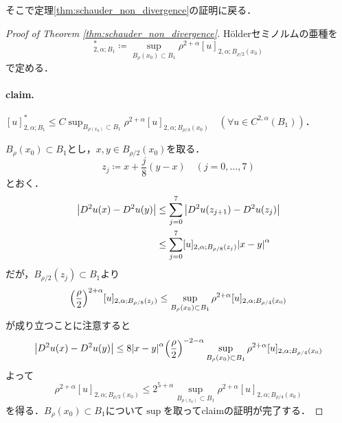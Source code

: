 \documentclass[a4paper]{ltjsarticle}
\newcommand{\1}{\mathbbm{1}}
\numberwithin{equation}{section}
\theoremstyle{definition}
\begin{document}
そこで定理\ref{thm:schauder_non_divergence}の証明に戻る．
\begin{proof}[Proof of Theorem \ref{thm:schauder_non_divergence}]
    Hölderセミノルムの亜種を
    \begin{equation}
        [u]^\ast_{2,\alpha;B_1}\coloneqq \sup_{B_\rho(x_0)\subset B_1}\rho^{2+\alpha}[u]_{2,\alpha;B_{\rho/2}(x_0)}
    \end{equation}
    で定める．
    \paragraph*{claim.}$[u]_{2,\alpha;B_1}^\ast\leq C\sup_{B_{\rho(x_0)}\subset B_1}\rho^{2+\alpha}[u]_{2,\alpha;B_{\rho/4}(x_0)}\quad (\forall u\in C^{2,\alpha}(B_1))$．

    $B_\rho(x_0)\subset B_1$とし，$x,y\in B_{\rho/2}(x_0)$を取る．
    \begin{equation}
        z_j\coloneqq x+\frac{j}{8}(y-x)\quad (j=0,\ldots,7)
    \end{equation}
    とおく．
    \begin{align}
        \abs{D^2u(x)-D^2u(y)}&\leq \sum_{j=0}^7 \abs{D^2u(z_{j+1})-D^2u(z_j)}\\
        &\leq \sum_{j=0}^7 [u]_{2,\alpha;B_{\rho/8}(z_j)}\abs{x-y}^{\alpha} 
    \end{align}
    だが，$B_{\rho/2}(z_j)\subset B_1$より
    \begin{equation}
        \qty(\frac{\rho}{2})^{2+\alpha}[u]_{2,\alpha;B_{\rho/8}(z_j)}\leq \sup_{B_\rho(x_0)\subset B_1}\rho^{2+\alpha}[u]_{2,\alpha;B_{\rho/4}(x_0)}
    \end{equation}
    が成り立つことに注意すると
    \begin{equation}
        \abs{D^2u(x)-D^2u(y)}\leq 8\abs{x-y}^\alpha \qty(\frac{\rho}{2})^{-2-\alpha} \sup_{B_\rho(x_0)\subset B_1}\rho^{2+\alpha}[u]_{2,\alpha;B_{\rho/4}(x_0)}
    \end{equation}
    よって
    \begin{equation}
        \rho^{2+\alpha}[u]_{2,\alpha;B_{\rho/2}(x_0)}\leq 2^{5+\alpha}\sup_{B_{\rho(x_0)}\subset B_1}\rho^{2+\alpha}[u]_{2,\alpha;B_{\rho/4}(x_0)}
    \end{equation}
    を得る．$B_\rho(x_0)\subset B_1$について$\sup$を取ってclaimの証明が完了する．


\end{proof}
\end{document}
